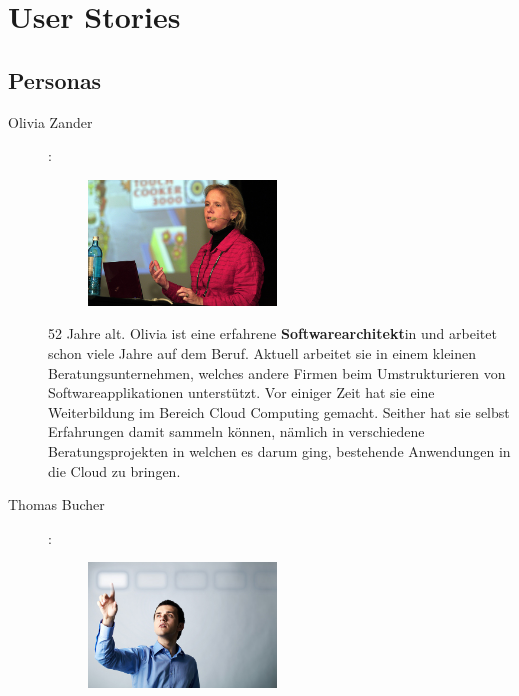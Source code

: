\section{User Stories}
	\subsection{Personas}
		\begin{description}
			\item[Olivia Zander]\label{olivia}:\newline
				\begin{minipage}[t]{0.35\textwidth} 
					\begin{figure}[H]
						\vspace{-0.75cm}
						\includegraphics[trim=0cm 0cm 0cm 0cm, clip=true, width=5cm]{requirements/media/img/oliviaZander.jpg}
						\caption[
						]
						{\label{Olivia Zander}}
					\end{figure}
				\end{minipage}
				\begin{minipage}[t]{0.55\textwidth}
					52 Jahre alt.
					Olivia ist eine erfahrene \textbf{Softwarearchitekt}in und arbeitet schon viele Jahre auf dem Beruf.
					Aktuell arbeitet sie in einem kleinen Beratungsunternehmen, welches andere Firmen beim Umstrukturieren von Softwareapplikationen unterstützt.
					Vor einiger Zeit hat sie eine Weiterbildung im Bereich Cloud Computing gemacht.
					Seither hat sie selbst Erfahrungen damit sammeln können, nämlich in verschiedene Beratungsprojekten in welchen es darum ging, bestehende Anwendungen in die Cloud zu bringen.
				\end{minipage}
			\item[Thomas Bucher]\label{thomas}:\newline
				\begin{minipage}[t]{0.35\textwidth} 
					\begin{figure}[H]
						\vspace{-0.75cm}
						\includegraphics[trim=0cm 0cm 0cm 0cm, clip=true, width=5cm]{requirements/media/img/thomasBucher.jpg}

\end{figure}
\end{minipage}
\end{description}
